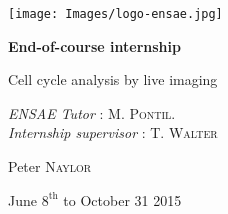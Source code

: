 \documentclass{article}
\begin{document}
\begin{titlepage}

  
\begin{center}
\texttt{[image: Images/logo-ensae.jpg]} 
\end{center}

 
\noindent
\hrulefill
  \begin{center} \bfseries\Huge
  End-of-course internship
  \end{center}
  \begin{center} \huge
   Cell cycle analysis by live imaging
  \end{center}
\hrulefill 
  
   \begin{center}  \large
\textit{ENSAE Tutor} : \textsc{M. Pontil}. \\
\textit{Internship supervisor} : \textsc{T. Walter}
   \end{center}
     
  \begin{center} \Large
  Peter \textsc{Naylor}
  \end{center}


  \begin{center}  \large
    June $8^{\text{th}}$ to October 31 2015
  \end{center}

\end{titlepage}






\newpage
\tableofcontents
\newpage



\newpage
\end{document}
